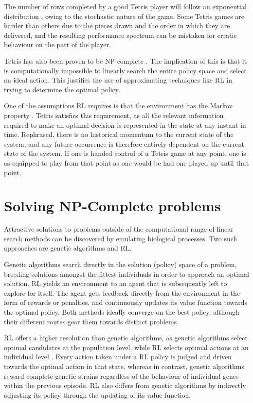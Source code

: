 \documentclass{rucsthesis}
\begin{document}
The number of rows completed by a good Tetris player will follow an exponential distribution \citep{tetstand}, owing to the stochastic nature of the game. Some Tetris games are harder than others due to the pieces drawn and the order in which they are delivered, and the resulting performance spectrum can be mistaken for erratic behaviour on the part of the player.

Tetris has also been proven to be NP-complete \citep{hardtet}. The implication of this is that it is computationally impossible to linearly search the entire policy space and select an ideal action. This justifies the use of approximating techniques like RL in trying to determine the optimal policy.

One of the assumptions RL requires is that the environment has the Markov property \citep{suttonbarto}. Tetris satisfies this requirement, as all the relevant information required to make an optimal decision is represented in the state at any instant in time. Rephrased, there is no historical momentum to the current state of the system, and any future occurrence is therefore entirely dependent on the current state of the system. If one is handed control of a Tetris game at any point, one is as equipped to play from that point as one would be had one played up until that point.

\section{Solving NP-Complete problems}

Attractive solutions to problems outside of the computational range of linear search methods can be discovered by emulating biological processes. Two such approaches are genetic algorithms and RL. 

Genetic algorithms search directly in the solution (policy) space of a problem, breeding solutions amongst the fittest individuals in order to approach an optimal solution. RL yields an environment to an agent that is subsequently left to explore for itself. The agent gets feedback directly from the environment in the form of rewards or penalties, and continuously updates its value function towards the optimal policy. Both methods ideally converge on the best policy\citep{evvsrl}, although their different routes gear them towards distinct problems.

RL offers a higher resolution than genetic algorithms, as genetic algorithms select optimal candidates at the population level, while RL  selects optimal actions at an individual level \citep{evvsrl}. Every action taken under a RL policy is judged and driven towards the optimal action in that state, whereas in contrast, genetic algorithms reward complete genetic strains regardless of the behaviour of individual genes within the previous episode. RL also differs from genetic algorithms by indirectly adjusting its policy through the updating of its value function. 
\end{document}
